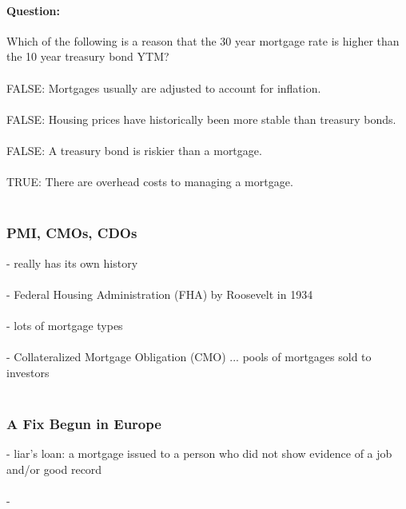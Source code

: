\documentclass{article} %
\begin{document}
     		\paragraph*{Question:}
     		Which of the following is a reason that the 30 year mortgage rate is higher than the 10 year treasury bond YTM? \\ \\


FALSE: Mortgages usually are adjusted to account for inflation. \\ \\


FALSE: Housing prices have historically been more stable than treasury bonds. \\ \\


FALSE: A treasury bond is riskier than a mortgage. \\ \\


TRUE: There are overhead costs to managing a mortgage. \\ \\
     	
     		\subsubsection*{PMI, CMOs, CDOs}
     		- really has its own history \\ \\
     		- Federal Housing Administration (FHA) by Roosevelt in 1934 \\ \\
     		- lots of mortgage types \\ \\
     		- Collateralized Mortgage Obligation (CMO) ... pools of mortgages sold to investors \\ \\
     		
     		\subsubsection*{A Fix Begun in Europe}
     		- liar's loan: a mortgage issued to a person who did not show evidence of a job and/or good record \\ \\ 
     		- 
     		
\end{document}
